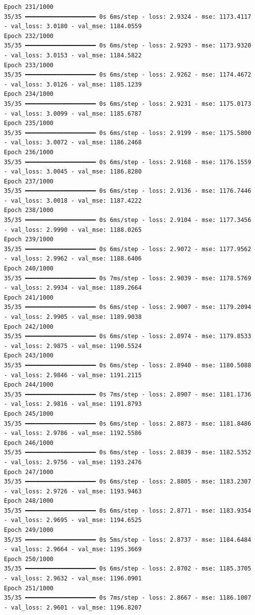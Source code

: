 \documentclass[
  letterpaper,
  DIV=11,
  numbers=noendperiod]{scrreprt}
\begin{document}
\begin{verbatim}
Epoch 231/1000
35/35 ━━━━━━━━━━━━━━━━━━━━ 0s 6ms/step - loss: 2.9324 - mse: 1173.4117 - val_loss: 3.0180 - val_mse: 1184.0559
Epoch 232/1000
35/35 ━━━━━━━━━━━━━━━━━━━━ 0s 6ms/step - loss: 2.9293 - mse: 1173.9320 - val_loss: 3.0153 - val_mse: 1184.5822
Epoch 233/1000
35/35 ━━━━━━━━━━━━━━━━━━━━ 0s 6ms/step - loss: 2.9262 - mse: 1174.4672 - val_loss: 3.0126 - val_mse: 1185.1239
Epoch 234/1000
35/35 ━━━━━━━━━━━━━━━━━━━━ 0s 6ms/step - loss: 2.9231 - mse: 1175.0173 - val_loss: 3.0099 - val_mse: 1185.6787
Epoch 235/1000
35/35 ━━━━━━━━━━━━━━━━━━━━ 0s 6ms/step - loss: 2.9199 - mse: 1175.5800 - val_loss: 3.0072 - val_mse: 1186.2468
Epoch 236/1000
35/35 ━━━━━━━━━━━━━━━━━━━━ 0s 6ms/step - loss: 2.9168 - mse: 1176.1559 - val_loss: 3.0045 - val_mse: 1186.8280
Epoch 237/1000
35/35 ━━━━━━━━━━━━━━━━━━━━ 0s 6ms/step - loss: 2.9136 - mse: 1176.7446 - val_loss: 3.0018 - val_mse: 1187.4222
Epoch 238/1000
35/35 ━━━━━━━━━━━━━━━━━━━━ 0s 6ms/step - loss: 2.9104 - mse: 1177.3456 - val_loss: 2.9990 - val_mse: 1188.0265
Epoch 239/1000
35/35 ━━━━━━━━━━━━━━━━━━━━ 0s 6ms/step - loss: 2.9072 - mse: 1177.9562 - val_loss: 2.9962 - val_mse: 1188.6406
Epoch 240/1000
35/35 ━━━━━━━━━━━━━━━━━━━━ 0s 7ms/step - loss: 2.9039 - mse: 1178.5769 - val_loss: 2.9934 - val_mse: 1189.2664
Epoch 241/1000
35/35 ━━━━━━━━━━━━━━━━━━━━ 0s 6ms/step - loss: 2.9007 - mse: 1179.2094 - val_loss: 2.9905 - val_mse: 1189.9038
Epoch 242/1000
35/35 ━━━━━━━━━━━━━━━━━━━━ 0s 6ms/step - loss: 2.8974 - mse: 1179.8533 - val_loss: 2.9875 - val_mse: 1190.5524
Epoch 243/1000
35/35 ━━━━━━━━━━━━━━━━━━━━ 0s 6ms/step - loss: 2.8940 - mse: 1180.5088 - val_loss: 2.9846 - val_mse: 1191.2115
Epoch 244/1000
35/35 ━━━━━━━━━━━━━━━━━━━━ 0s 7ms/step - loss: 2.8907 - mse: 1181.1736 - val_loss: 2.9816 - val_mse: 1191.8793
Epoch 245/1000
35/35 ━━━━━━━━━━━━━━━━━━━━ 0s 6ms/step - loss: 2.8873 - mse: 1181.8486 - val_loss: 2.9786 - val_mse: 1192.5586
Epoch 246/1000
35/35 ━━━━━━━━━━━━━━━━━━━━ 0s 6ms/step - loss: 2.8839 - mse: 1182.5352 - val_loss: 2.9756 - val_mse: 1193.2476
Epoch 247/1000
35/35 ━━━━━━━━━━━━━━━━━━━━ 0s 6ms/step - loss: 2.8805 - mse: 1183.2307 - val_loss: 2.9726 - val_mse: 1193.9463
Epoch 248/1000
35/35 ━━━━━━━━━━━━━━━━━━━━ 0s 6ms/step - loss: 2.8771 - mse: 1183.9354 - val_loss: 2.9695 - val_mse: 1194.6525
Epoch 249/1000
35/35 ━━━━━━━━━━━━━━━━━━━━ 0s 5ms/step - loss: 2.8737 - mse: 1184.6484 - val_loss: 2.9664 - val_mse: 1195.3669
Epoch 250/1000
35/35 ━━━━━━━━━━━━━━━━━━━━ 0s 6ms/step - loss: 2.8702 - mse: 1185.3705 - val_loss: 2.9632 - val_mse: 1196.0901
Epoch 251/1000
35/35 ━━━━━━━━━━━━━━━━━━━━ 0s 7ms/step - loss: 2.8667 - mse: 1186.1007 - val_loss: 2.9601 - val_mse: 1196.8207

\end{verbatim}
\end{document}
